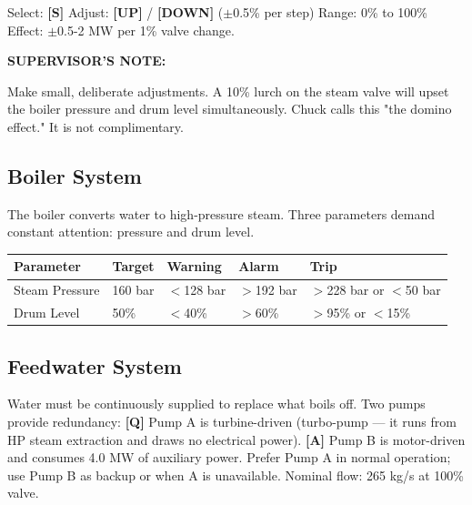 \documentclass[10pt,a5paper]{article}
\newenvironment{notebox}{%
  \vspace{4pt}%
  \textbf{SUPERVISOR'S NOTE:} \bfseries%
}{%
}
\newcommand{\key}[1]{\textbf{[#1]}}
\begin{document}
Select: \key{S} \quad Adjust: \key{UP} / \key{DOWN} ($\pm$0.5\% per step) \quad
Range: 0\% to 100\% \quad Effect: $\pm$0.5-2 MW per 1\% valve change.

\begin{notebox}
Make small, deliberate adjustments. A 10\% lurch on the steam valve will upset
the boiler pressure and drum level simultaneously. Chuck calls this "the domino
effect." It is not complimentary.
\end{notebox}

\subsection{Boiler System}

The boiler converts water to high-pressure steam. Three parameters demand
constant attention: pressure and drum level.%


\begin{center}
\begin{tabular}{p{2cm}p{15mm}p{15mm}p{2cm}p{2cm}}
\toprule
\textbf{Parameter} & \textbf{Target} & \textbf{Warning} & \textbf{Alarm} & \textbf{Trip} \\
\midrule
Steam Pressure & 160 bar & $<$128 bar       & $>$192 bar               & $>$228 bar or $<$50 bar \\ [5mm]
Drum Level     & 50\% & $<$40\%          & $>$60\%                  & $>$95\% or $<$15\%  \\ [5mm]
\bottomrule
\end{tabular}
\end{center}

\subsection{Feedwater System}

Water must be continuously supplied to replace what boils off. Two pumps provide
redundancy: \key{Q} Pump A is turbine-driven (turbo-pump --- it runs from HP steam
extraction and draws no electrical power). \key{A} Pump B is motor-driven and
consumes 4.0 MW of auxiliary power. Prefer Pump A in normal operation; use Pump B
as backup or when A is unavailable. Nominal flow: 265 kg/s at 100\% valve.
\end{document}
